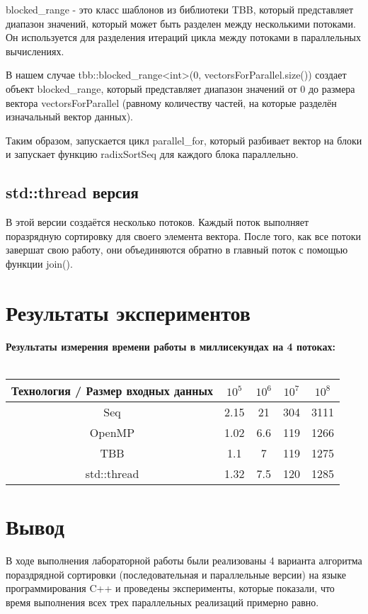 \documentclass{article}
\begin{document}
blocked\_range - это класс шаблонов из библиотеки TBB, который представляет диапазон значений, который может быть разделен между несколькими потоками. Он используется для разделения итераций цикла между потоками в параллельных вычислениях.

В нашем случае tbb::blocked\_range<int>(0, vectorsForParallel.size()) создает объект blocked\_range, который представляет диапазон значений от 0 до размера вектора vectorsForParallel (равному количеству частей, на которые разделён изначальный вектор данных).

Таким образом, запускается цикл parallel\_for, который разбивает вектор на блоки и запускает функцию radixSortSeq для каждого блока параллельно.

\subsection{std::thread версия}
В этой версии создаётся несколько потоков. Каждый поток выполняет поразрядную сортировку для своего элемента вектора. После того, как все потоки завершат свою работу, они объединяются обратно в главный поток с помощью функции join().

\newpage
\section{Результаты экспериментов}

\noindent\textbf{Результаты измерения времени работы в миллисекундах на 4 потоках:}\\\\
    \begin{tabular}{|c | c | c | c | c |} 
      \hline
      Технология / Размер входных данных & $10^5$ & $10^6$ & $10^7$ & $10^8$ \\
      \hline
      Seq & 2.15 & 21  & 304 & 3111 \\ 
      \hline
      OpenMP & 1.02 & 6.6  & 119 & 1266 \\ 
      \hline
      TBB & 1.1 & 7  & 119 & 1275 \\ 
      \hline
      std::thread & 1.32 & 7.5  & 120 & 1285 \\ 
      \hline
    \end{tabular}


\newpage
\section{Вывод}
В ходе выполнения лабораторной работы были реализованы 4 варианта алгоритма пораздрядной сортировки (последовательная и параллельные версии) на языке программирования C++ и проведены эксперименты, которые показали, что время выполнения всех трех параллельных реализаций примерно равно.
\end{document}
